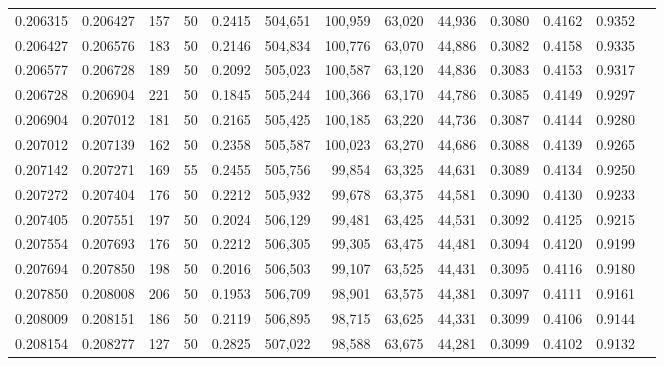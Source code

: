 \begin{tabular}{rrrrrrrrrrrrr}
0.206315 & 0.206427 &   157 &  50 &                                     0.2415 & 504,651 & 100,959 &  63,020 &  44,936 & 0.3080 & 0.4162 & 0.9352 \\
0.206427 & 0.206576 &   183 &  50 &                                     0.2146 & 504,834 & 100,776 &  63,070 &  44,886 & 0.3082 & 0.4158 & 0.9335 \\
0.206577 & 0.206728 &   189 &  50 &                                     0.2092 & 505,023 & 100,587 &  63,120 &  44,836 & 0.3083 & 0.4153 & 0.9317 \\
0.206728 & 0.206904 &   221 &  50 &                                     0.1845 & 505,244 & 100,366 &  63,170 &  44,786 & 0.3085 & 0.4149 & 0.9297 \\
0.206904 & 0.207012 &   181 &  50 &                                     0.2165 & 505,425 & 100,185 &  63,220 &  44,736 & 0.3087 & 0.4144 & 0.9280 \\
0.207012 & 0.207139 &   162 &  50 &                                     0.2358 & 505,587 & 100,023 &  63,270 &  44,686 & 0.3088 & 0.4139 & 0.9265 \\
0.207142 & 0.207271 &   169 &  55 &                                     0.2455 & 505,756 &  99,854 &  63,325 &  44,631 & 0.3089 & 0.4134 & 0.9250 \\
0.207272 & 0.207404 &   176 &  50 &                                     0.2212 & 505,932 &  99,678 &  63,375 &  44,581 & 0.3090 & 0.4130 & 0.9233 \\
0.207405 & 0.207551 &   197 &  50 &                                     0.2024 & 506,129 &  99,481 &  63,425 &  44,531 & 0.3092 & 0.4125 & 0.9215 \\
0.207554 & 0.207693 &   176 &  50 &                                     0.2212 & 506,305 &  99,305 &  63,475 &  44,481 & 0.3094 & 0.4120 & 0.9199 \\
0.207694 & 0.207850 &   198 &  50 &                                     0.2016 & 506,503 &  99,107 &  63,525 &  44,431 & 0.3095 & 0.4116 & 0.9180 \\
0.207850 & 0.208008 &   206 &  50 &                                     0.1953 & 506,709 &  98,901 &  63,575 &  44,381 & 0.3097 & 0.4111 & 0.9161 \\
0.208009 & 0.208151 &   186 &  50 &                                     0.2119 & 506,895 &  98,715 &  63,625 &  44,331 & 0.3099 & 0.4106 & 0.9144 \\
0.208154 & 0.208277 &   127 &  50 &                                     0.2825 & 507,022 &  98,588 &  63,675 &  44,281 & 0.3099 & 0.4102 & 0.9132 \\

\end{tabular}
